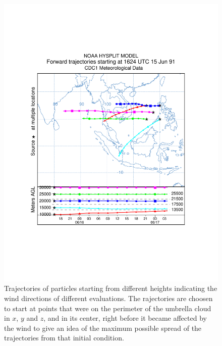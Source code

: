 \documentclass[utf8]{frontiersSCNS} %
\begin{document}
\begin{figure}[!htb]
\centering
\begin{minipage}{.75 \textwidth}
\centering
\includegraphics[width=0.99 \textwidth]{Figures/trajplot_test3_10_30K_ok}
\end{minipage}%
\caption{Trajectories of particles starting from different heights indicating the wind directions of different evaluations. The rajectories are choosen to start at points that were on the perimeter of the umbrella cloud in $x$, $y$ and $z$, and in its center, right before it became affected by the wind to give an idea of the maximum possible spread of the trajectories from that initial condition.}
\label{fig:hysplit-1624-utc}
\end{figure}
\end{document}
